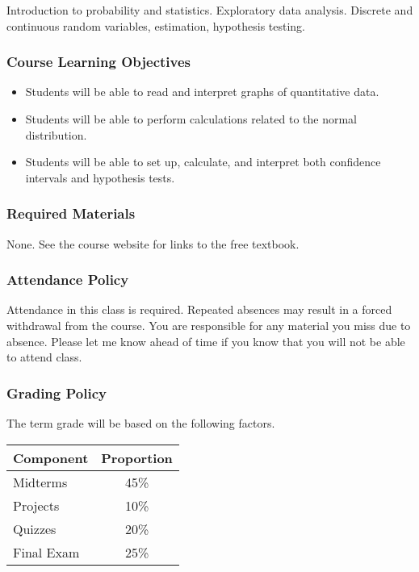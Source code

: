 \documentclass[10pt]{article}
\begin{document}
Introduction to probability and statistics. Exploratory data analysis. Discrete and continuous random variables, estimation, hypothesis testing.

\subsubsection*{Course Learning Objectives}

\begin{itemize}

\item Students will be able to read and interpret graphs of quantitative data.
\item Students will be able to perform calculations related to the normal distribution. 
\item Students will be able to set up, calculate, and interpret both confidence intervals and hypothesis tests.

\end{itemize}

\subsubsection*{Required Materials}

None. See the course website for links to the free textbook.

%
\subsubsection*{Attendance Policy}

Attendance in this class is required. Repeated absences may result in a forced withdrawal from the course. You are responsible for any material you miss due to absence. Please let me know ahead of time if you know that you will not be able to attend class.

\subsubsection*{Grading Policy}

The term grade will be based on the following factors.

\begin{center}
\begin{tabular}{|l|c|}
\hline
Component      & Proportion \\ \hline
Midterms  & 45\% \\
Projects  & 10\% \\
Quizzes  & 20\% \\
Final Exam  & 25\% \\ \hline
\end{tabular}
\end{center}
\end{document}
